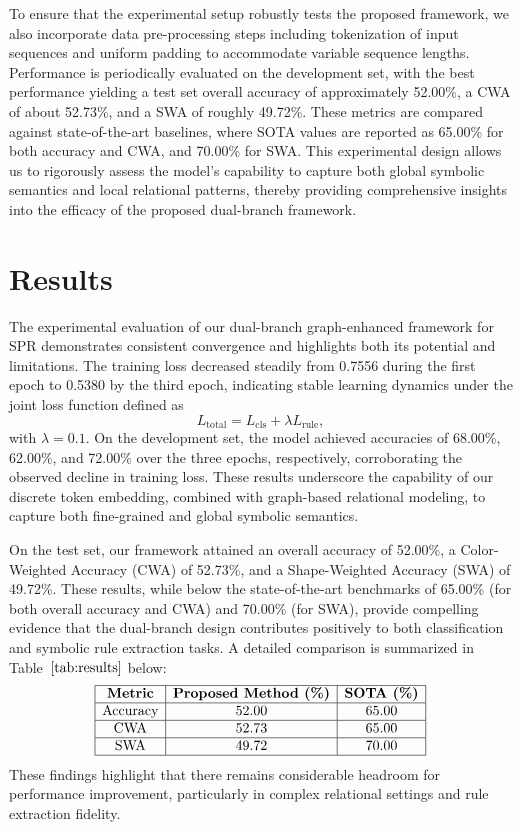 \documentclass{article}
\begin{document}
To ensure that the experimental setup robustly tests the proposed framework, we also incorporate data pre-processing steps including tokenization of input sequences and uniform padding to accommodate variable sequence lengths. Performance is periodically evaluated on the development set, with the best performance yielding a test set overall accuracy of approximately 52.00\%, a CWA of about 52.73\%, and a SWA of roughly 49.72\%. These metrics are compared against state-of-the-art baselines, where SOTA values are reported as 65.00\% for both accuracy and CWA, and 70.00\% for SWA. This experimental design allows us to rigorously assess the model’s capability to capture both global symbolic semantics and local relational patterns, thereby providing comprehensive insights into the efficacy of the proposed dual-branch framework.

\section{Results}
The experimental evaluation of our dual-branch graph-enhanced framework for SPR demonstrates consistent convergence and highlights both its potential and limitations. The training loss decreased steadily from 0.7556 during the first epoch to 0.5380 by the third epoch, indicating stable learning dynamics under the joint loss function defined as 
\[
L_{\text{total}} = L_{\text{cls}} + \lambda L_{\text{rule}},
\]
with \(\lambda = 0.1\). On the development set, the model achieved accuracies of 68.00\%, 62.00\%, and 72.00\% over the three epochs, respectively, corroborating the observed decline in training loss. These results underscore the capability of our discrete token embedding, combined with graph-based relational modeling, to capture both fine-grained and global symbolic semantics.

On the test set, our framework attained an overall accuracy of 52.00\%, a Color-Weighted Accuracy (CWA) of 52.73\%, and a Shape-Weighted Accuracy (SWA) of 49.72\%. These results, while below the state-of-the-art benchmarks of 65.00\% (for both overall accuracy and CWA) and 70.00\% (for SWA), provide compelling evidence that the dual-branch design contributes positively to both classification and symbolic rule extraction tasks. A detailed comparison is summarized in Table~\(\ref{tab:results}\) below:
\[
\begin{array}{|c|c|c|}
\hline
\textbf{Metric} & \textbf{Proposed Method (\%)} & \textbf{SOTA (\%)} \\
\hline
\text{Accuracy} & 52.00 & 65.00 \\
\hline
\text{CWA} & 52.73 & 65.00 \\
\hline
\text{SWA} & 49.72 & 70.00 \\
\hline
\end{array}
\]
These findings highlight that there remains considerable headroom for performance improvement, particularly in complex relational settings and rule extraction fidelity.
\end{document}

